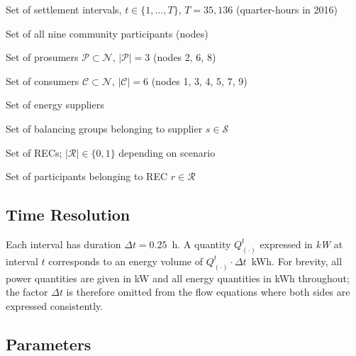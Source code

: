 \documentclass[12pt,a4paper]{article}
\begin{document}
\begin{description}[leftmargin=4em, labelwidth=3.5em]
  \item[$\mathcal{T}$] Set of settlement intervals, $t \in \{1, \ldots, T\}$,
        $T = 35{,}136$ (quarter-hours in 2016)
  \item[$\mathcal{N}$] Set of all nine community participants (nodes)
  \item[$\mathcal{P}$] Set of prosumers $\mathcal{P} \subset \mathcal{N}$,
        $|\mathcal{P}| = 3$ (nodes 2, 6, 8)
  \item[$\mathcal{C}$] Set of consumers $\mathcal{C} \subset \mathcal{N}$,
        $|\mathcal{C}| = 6$ (nodes 1, 3, 4, 5, 7, 9)
  \item[$\mathcal{S}$] Set of energy suppliers
  \item[$\mathcal{G}_{s}$] Set of balancing groups belonging to supplier
        $s \in \mathcal{S}$
  \item[$\mathcal{R}$] Set of RECs; $|\mathcal{R}| \in \{0, 1\}$ depending on
        scenario
  \item[$\mathcal{M}_{r}$] Set of participants belonging to REC
        $r \in \mathcal{R}$
\end{description}

\subsection{Time Resolution}

Each interval has duration $\Delta t = 0.25$~h.
A quantity $Q_{(\cdot)}^{t}$ expressed in \textit{kW} at interval $t$
corresponds to an energy volume of $Q_{(\cdot)}^{t} \cdot \Delta t$~kWh.
For brevity, all power quantities are given in kW and all energy quantities in
kWh throughout; the factor $\Delta t$ is therefore omitted from the flow
equations where both sides are expressed consistently.

\subsection{Parameters}
\end{document}
